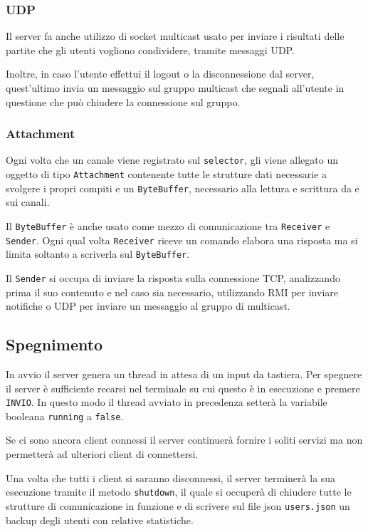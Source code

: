 \subsubsection{UDP}
Il server fa anche utilizzo di socket multicast usato per inviare i risultati delle partite che
gli utenti vogliono condividere, tramite messaggi UDP.

Inoltre, in caso l'utente effettui il logout o la disconnessione dal server, quest'ultimo invia
un messaggio sul gruppo multicast che segnali all'utente in questione che può chiudere la
connessione sul gruppo.

\subsubsection{Attachment}
Ogni volta che un canale viene registrato sul \verb|selector|, gli viene allegato un oggetto di
tipo \verb|Attachment| contenente tutte le strutture dati necessarie a svolgere i propri compiti
e un \verb|ByteBuffer|, necessario alla lettura e scrittura da e sui canali.

Il \verb|ByteBuffer| è anche usato come mezzo di comunicazione tra \verb|Receiver| e
\verb|Sender|. Ogni qual volta \verb|Receiver| riceve un comando elabora una risposta ma si limita
soltanto a scriverla sul \verb|ByteBuffer|.

Il \verb|Sender| si occupa di inviare la risposta sulla connessione TCP, analizzando prima il suo
contenuto e nel caso sia necessario, utilizzando RMI per inviare notifiche o UDP per inviare un
messaggio al gruppo di multicast.

\subsection{Spegnimento}
In avvio il server genera un thread in attesa di un input da tastiera. Per spegnere il server è
sufficiente recarsi nel terminale su cui questo è in esecuzione e premere \verb|INVIO|. In questo
modo il thread avviato in precedenza setterà la variabile booleana \verb|running| a \verb|false|.

Se ci sono ancora client connessi il server continuerà fornire i soliti servizi ma non permetterà
ad ulteriori client di connettersi.

Una volta che tutti i client si saranno disconnessi, il server terminerà la sua esecuzione tramite
il metodo \verb|shutdown|, il quale si occuperà di chiudere tutte le strutture di comunicazione
in funzione e di scrivere sul file json \verb|users.json| un backup degli utenti con relative
statistiche.
